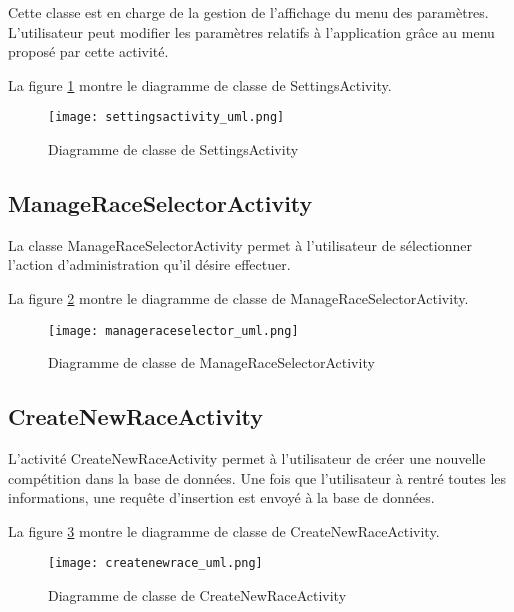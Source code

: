 Cette classe est en charge de la gestion de l'affichage du menu des paramètres. L'utilisateur peut modifier les paramètres relatifs à l'application grâce au menu proposé par cette activité.

La figure \ref{fig:settingsactivity_uml} montre le diagramme de classe de SettingsActivity.

\begin{figure}[htb]
\centering 
\texttt{[image: settingsactivity\_uml.png]} 
\caption{Diagramme de classe de SettingsActivity}
\label{fig:settingsactivity_uml}
 \end{figure}


\subsection{ManageRaceSelectorActivity}

La classe ManageRaceSelectorActivity permet à l'utilisateur de sélectionner l'action d'administration qu'il désire effectuer.

La figure \ref{fig:manageraceselector_uml} montre le diagramme de classe de ManageRaceSelectorActivity.

\begin{figure}[htb]
\centering 
\texttt{[image: manageraceselector\_uml.png]} 
\caption{Diagramme de classe de ManageRaceSelectorActivity}
\label{fig:manageraceselector_uml}
 \end{figure}


\subsection{CreateNewRaceActivity}

L'activité CreateNewRaceActivity permet à l'utilisateur de créer une nouvelle compétition dans la base de données. Une fois que l'utilisateur à rentré toutes les informations, une requête d'insertion est envoyé à la base de données.

La figure \ref{fig:createnewrace_uml} montre le diagramme de classe de CreateNewRaceActivity.

\begin{figure}[htb]
\centering 
\texttt{[image: createnewrace\_uml.png]} 
\caption{Diagramme de classe de CreateNewRaceActivity}
\label{fig:createnewrace_uml}
 \end{figure}

